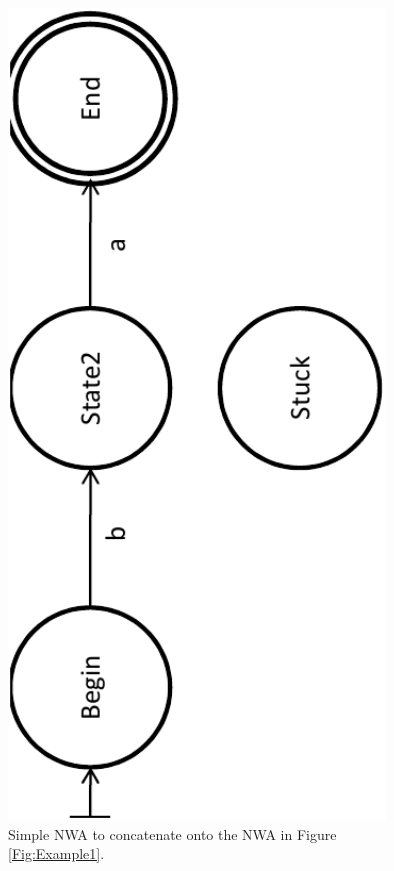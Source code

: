 \begin{figure}[p]
  \centering
    \includegraphics[width=10cm]{Figures/Figure9}
  \caption{Simple NWA to concatenate onto the NWA in Figure \ref{Fig:Example1}.}
  \label{Fig:Concat1}
\end{figure}

